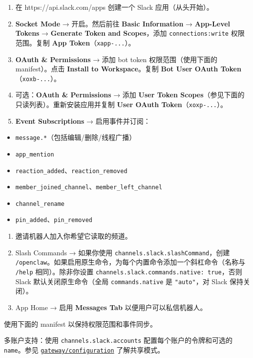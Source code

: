 \begin{enumerate}
  \item 在 https://api.slack.com/apps 创建一个 Slack 应用（从头开始）。
  \item \textbf{Socket Mode} → 开启。然后前往 \textbf{Basic Information} → \textbf{App-Level Tokens} → \textbf{Generate Token and Scopes}，添加 \texttt{connections:write} 权限范围。复制 \textbf{App Token}（\texttt{xapp-...}）。
  \item \textbf{OAuth \& Permissions} → 添加 bot token 权限范围（使用下面的 manifest）。点击 \textbf{Install to Workspace}。复制 \textbf{Bot User OAuth Token}（\texttt{xoxb-...}）。
  \item 可选：\textbf{OAuth \& Permissions} → 添加 \textbf{User Token Scopes}（参见下面的只读列表）。重新安装应用并复制 \textbf{User OAuth Token}（\texttt{xoxp-...}）。
  \item \textbf{Event Subscriptions} → 启用事件并订阅：
\end{enumerate}

\begin{itemize}
  \item \texttt{message.*}（包括编辑/删除/线程广播）
  \item \texttt{app\_mention}
  \item \texttt{reaction\_added}、\texttt{reaction\_removed}
  \item \texttt{member\_joined\_channel}、\texttt{member\_left\_channel}
  \item \texttt{channel\_rename}
  \item \texttt{pin\_added}、\texttt{pin\_removed}
\end{itemize}

\begin{enumerate}
  \item 邀请机器人加入你希望它读取的频道。
  \item Slash Commands → 如果你使用 \texttt{channels.slack.slashCommand}，创建 \texttt{/openclaw}。如果启用原生命令，为每个内置命令添加一个斜杠命令（名称与 \texttt{/help} 相同）。除非你设置 \texttt{channels.slack.commands.native: true}，否则 Slack 默认关闭原生命令（全局 \texttt{commands.native} 是 \texttt{"auto"}，对 Slack 保持关闭）。
  \item App Home → 启用 \textbf{Messages Tab} 以便用户可以私信机器人。
\end{enumerate}


使用下面的 manifest 以保持权限范围和事件同步。

多账户支持：使用 \texttt{channels.slack.accounts} 配置每个账户的令牌和可选的 \texttt{name}。参见 \href{/gateway/configuration\#telegramaccounts--discordaccounts--slackaccounts--signalaccounts--imessageaccounts}{\texttt{gateway/configuration}} 了解共享模式。

